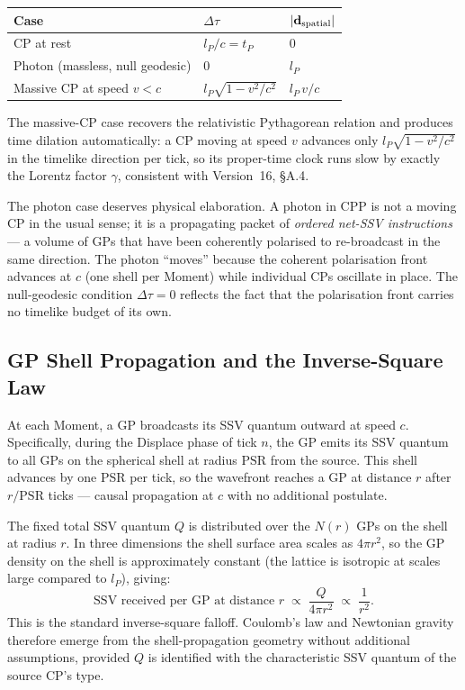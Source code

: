 \documentclass[12pt]{article}
\begin{document}
\begin{center}
\begin{tabular}{@{}lll@{}}
\toprule
Case & $\Delta\tau$ & $|\mathbf{d}_{\rm spatial}|$ \\
\midrule
CP at rest & $l_P/c = t_P$ & $0$ \\
Photon (massless, null geodesic) & $0$ & $l_P$ \\
Massive CP at speed $v < c$ &
  $l_P\sqrt{1-v^2/c^2}$ & $l_P\,v/c$ \\
\bottomrule
\end{tabular}
\end{center}

The massive-CP case recovers the relativistic Pythagorean relation and
produces time dilation automatically: a CP moving at speed $v$ advances only
$l_P\sqrt{1-v^2/c^2}$ in the timelike direction per tick, so its proper-time
clock runs slow by exactly the Lorentz factor $\gamma$, consistent with
Version~16, \S A.4.

The photon case deserves physical elaboration.  A photon in CPP is not a
moving CP in the usual sense; it is a propagating packet of
\emph{ordered net-SSV instructions} --- a volume of GPs that have been
coherently polarised to re-broadcast in the same direction.  The photon
``moves'' because the coherent polarisation front advances at $c$ (one shell
per Moment) while individual CPs oscillate in place.  The null-geodesic
condition $\Delta\tau = 0$ reflects the fact that the polarisation front
carries no timelike budget of its own.

\subsection{GP Shell Propagation and the Inverse-Square Law}

At each Moment, a GP broadcasts its SSV quantum outward at speed $c$.
Specifically, during the Displace phase of tick $n$, the GP emits its SSV
quantum to all GPs on the spherical shell at radius $\text{PSR}$ from the
source.  This shell advances by one PSR per tick, so the wavefront reaches
a GP at distance $r$ after $r/\text{PSR}$ ticks --- causal propagation at
$c$ with no additional postulate.

The fixed total SSV quantum $Q$ is distributed over the $N(r)$ GPs on the
shell at radius $r$.  In three dimensions the shell surface area scales as
$4\pi r^2$, so the GP density on the shell is approximately constant (the
lattice is isotropic at scales large compared to $l_P$), giving:
\begin{equation}
  \text{SSV received per GP at distance }r
  \;\propto\; \frac{Q}{4\pi r^2}
  \;\propto\; \frac{1}{r^2}.
  \label{eq:invsq}
\end{equation}
This is the standard inverse-square falloff.  Coulomb's law and Newtonian
gravity therefore emerge from the shell-propagation geometry without
additional assumptions, provided $Q$ is identified with the characteristic
SSV quantum of the source CP's type.
\end{document}
